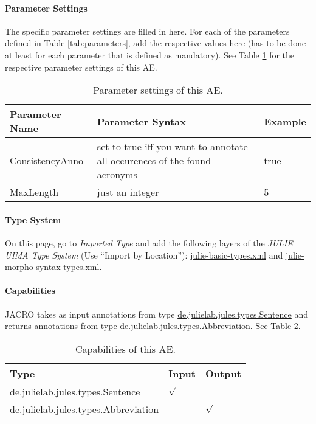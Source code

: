 \documentclass[11pt,a4paper,halfparskip]{scrartcl}
\begin{document}
\paragraph{Parameter Settings}
\label{sss:param_settings}

The specific parameter settings are filled in here. For each of the
parameters defined in Table \ref{tab:parameters}, add the respective values
here (has to be done at least for each parameter that is defined as
mandatory). See Table \ref{tab:param_settings} for the respective
parameter settings of this AE.

\begin{table}[h!]
  \centering
  \begin{tabular}{|p{2.8cm}|p{5cm}|p{6cm}|}
    \hline
    Parameter Name & Parameter Syntax & Example \\
    \hline\hline
    \hline
    ConsistencyAnno & set to true iff you want to annotate all occurences of the found acronyms &
    true\\
\hline
MaxLength & just an integer & 5 \\
  \hline
  \end{tabular}
  \caption{Parameter settings of this AE.}
  \label{tab:param_settings}
\end{table}

\paragraph{Type System}
\label{sss:type_system}
On this page, go to \emph{Imported Type} and add the following layers
of the \emph{JULIE UIMA Type System} (Use ``Import by Location''):
\url{julie-basic-types.xml} and \url{julie-morpho-syntax-types.xml}.


\paragraph{Capabilities}
\label{sss:capabilities}
JACRO takes as input annotations from type \url{de.julielab.jules.types.Sentence} and returns annotations from type \url{de.julielab.jules.types.Abbreviation}. See Table \ref{tab:capabilities}.
\begin{table}[h!]
  \centering
  \begin{tabular}{|p{5cm}|p{2cm}|p{2cm}|}
    \hline
    Type & Input & Output \\
    \hline\hline
     de.julielab.jules.types.Sentence & $\surd$ & \\
      \hline
     de.julielab.jules.types.Abbreviation & &  $\surd$  \\
      \hline
  \end{tabular}
  \caption{Capabilities of this AE.}
  \label{tab:capabilities}
\end{table} 
\end{document}
